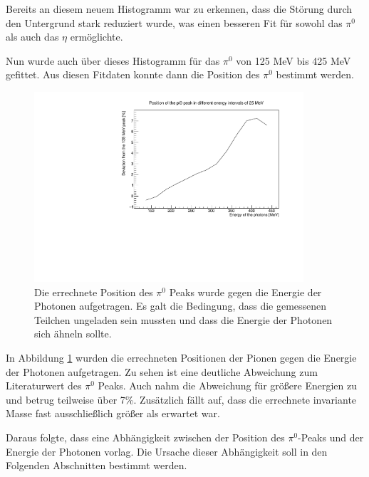 \documentclass[a4paper,11pt,oneside,final,german,openbib,pdftex]{scrbook}
\begin{document}
{ Bereits an diesem neuem Histogramm war zu erkennen, dass die St\"orung durch den Untergrund stark reduziert wurde, was einen besseren Fit f\"ur sowohl das $\pi^0$ als auch das $\eta$ erm\"oglichte.
 
 Nun wurde auch \"uber dieses Histogramm f\"ur das $\pi^0$ von 125 MeV bis 425 MeV gefittet.
 Aus diesen Fitdaten konnte dann die Position des $\pi^0$ bestimmt werden. 
 
 \begin{figure}[h!]
 	\begin{center}
 		\includegraphics[width=100mm]{20172803SymmetricUnchargedDeviation}
 	
 		\caption{Die errechnete Position des $\pi^0$ Peaks wurde gegen die Energie der Photonen aufgetragen.
 			Es galt die Bedingung, dass die gemessenen Teilchen ungeladen sein mussten und dass die Energie der Photonen sich \"ahneln sollte.
 		} 
 		\label{fig.Energydependency_pion}
 	\end{center}
 \end{figure}

In Abbildung \ref{fig.Energydependency_pion} wurden die errechneten Positionen der Pionen gegen die Energie der Photonen aufgetragen. Zu sehen ist eine deutliche Abweichung zum Literaturwert des $\pi^0$ Peaks. Auch nahm die Abweichung für größere Energien zu und betrug teilweise \"uber 7\%. Zus\"atzlich f\"allt auf, dass die errechnete invariante Masse fast ausschlie{\ss}lich gr\"o{\ss}er als erwartet war.
  
Daraus folgte, dass eine Abhängigkeit zwischen der Position des $\pi^0$-Peaks und der Energie der Photonen vorlag. Die Ursache dieser Abh\"angigkeit soll in den Folgenden Abschnitten bestimmt werden.

}
\end{document}
